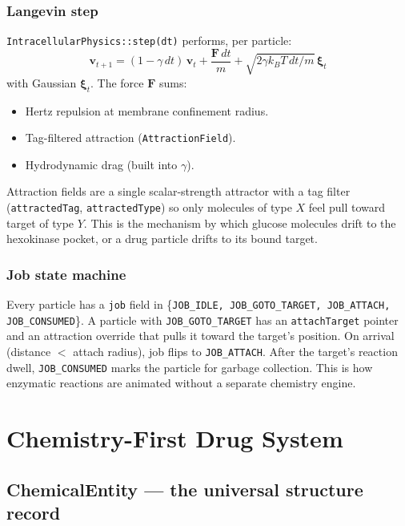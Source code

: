 \documentclass[11pt,letterpaper,twoside,openany]{book}
\newcommand{\code}[1]{\texttt{#1}}
\begin{document}
\section{Langevin step}

\code{IntracellularPhysics::step(dt)} performs, per particle:
\begin{equation}
  \mathbf{v}_{t+1} = (1-\gamma\,dt)\,\mathbf{v}_t + \frac{\mathbf{F}\,dt}{m} + \sqrt{2\gamma k_B T\,dt/m}\,\boldsymbol{\xi}_t
\end{equation}
with Gaussian $\boldsymbol{\xi}_t$. The force $\mathbf{F}$ sums:
\begin{itemize}
  \item Hertz repulsion at membrane confinement radius.
  \item Tag-filtered attraction (\code{AttractionField}).
  \item Hydrodynamic drag (built into $\gamma$).
\end{itemize}

Attraction fields are a single scalar-strength attractor with a tag
filter (\code{attractedTag}, \code{attractedType}) so only molecules
of type $X$ feel pull toward target of type $Y$. This is the
mechanism by which glucose molecules drift to the hexokinase
pocket, or a drug particle drifts to its bound target.

\section{Job state machine}

Every particle has a \code{job} field in
\{\code{JOB\_IDLE, JOB\_GOTO\_TARGET, JOB\_ATTACH,
JOB\_CONSUMED}\}. A particle with \code{JOB\_GOTO\_TARGET} has an
\code{attachTarget} pointer and an attraction override that pulls
it toward the target's position. On arrival (distance $<$ attach
radius), job flips to \code{JOB\_ATTACH}. After the target's
reaction dwell, \code{JOB\_CONSUMED} marks the particle for garbage
collection. This is how enzymatic reactions are animated without a
separate chemistry engine.

\part{Chemistry-First Drug System}

\chapter{ChemicalEntity --- the universal structure record}
\label{ch:chementity}
\end{document}
